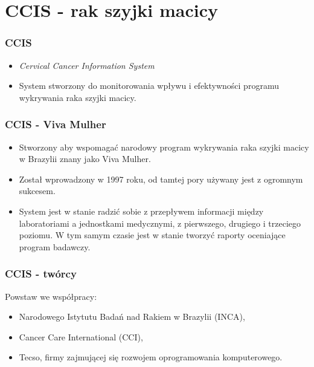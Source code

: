 \section{CCIS - rak szyjki macicy}

\begin{frame}
\frametitle{CCIS}

  \begin{itemize}
    \item \textit{Cervical Cancer Information System}
    \item System stworzony do monitorowania wpływu i efektywności programu wykrywania raka szyjki macicy.
  \end{itemize}

\end{frame}

\begin{frame}
\frametitle{CCIS - Viva Mulher}

  \begin{itemize}
    \item Stworzony aby wspomagać narodowy program wykrywania raka szyjki macicy w Brazylii znany jako Viva Mulher.
    \item Został wprowadzony w 1997 roku, od tamtej pory używany jest z ogromnym sukcesem.
    \item System jest w stanie radzić sobie z przepływem informacji między laboratoriami a jednostkami medycznymi, z pierwszego, drugiego i trzeciego poziomu. W tym samym czasie jest w stanie tworzyć raporty oceniające program badawczy.
  \end{itemize}

\end{frame}

\begin{frame}
\frametitle{CCIS - twórcy}

Powstaw we współpracy:
  \begin{itemize}
    \item Narodowego Istytutu Badań nad Rakiem w Brazylii (INCA),
    \item Cancer Care International (CCI),
    \item Tecso, firmy zajmującej się rozwojem oprogramowania komputerowego.
  \end{itemize}

\end{frame}


